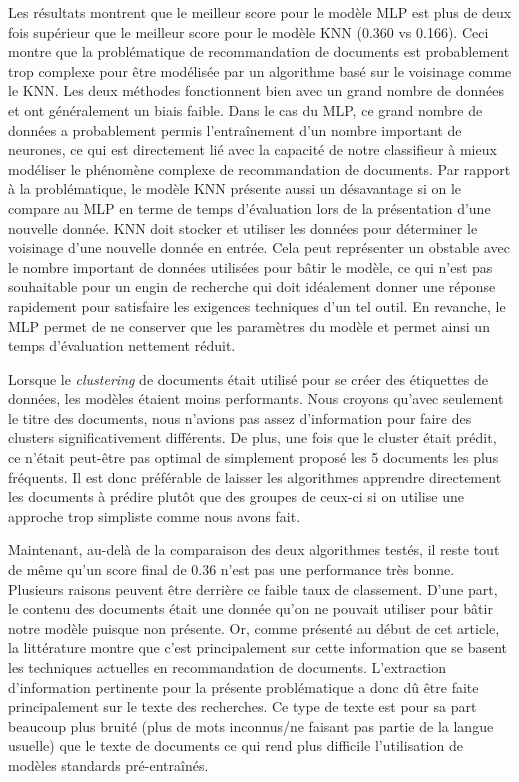 Les résultats montrent que le meilleur score pour le modèle MLP est plus de deux fois supérieur que le meilleur score pour le modèle KNN (0.360 vs 0.166). 
Ceci montre que la problématique de recommandation de documents est probablement trop complexe pour être modélisée par un algorithme basé sur le voisinage comme le KNN. 
Les deux méthodes fonctionnent bien avec un grand nombre de données et ont généralement un biais faible. 
Dans le cas du MLP, ce grand nombre de données a probablement permis l'entraînement d'un nombre important de neurones, ce qui est directement lié avec la capacité de notre classifieur à mieux modéliser le phénomène complexe de recommandation de documents. 
Par rapport à la problématique, le modèle KNN présente aussi un désavantage si on le compare au MLP en terme de temps d'évaluation lors de la présentation d'une nouvelle donnée. KNN doit stocker et utiliser les données pour déterminer le voisinage d'une nouvelle donnée en entrée. 
Cela peut représenter un obstable avec le nombre important de données utilisées pour bâtir le modèle, ce qui n'est pas souhaitable pour un engin de recherche qui doit idéalement donner une réponse rapidement pour satisfaire les exigences techniques d'un tel outil. 
En revanche, le MLP permet de ne conserver que les paramètres du modèle et permet ainsi un temps d'évaluation nettement réduit.
\break

Lorsque le \textit{clustering} de documents était utilisé pour se créer des étiquettes de données, les modèles étaient moins performants. 
Nous croyons qu'avec seulement le titre des documents, nous n'avions pas assez d'information pour faire des clusters significativement différents. 
De plus, une fois que le cluster était prédit, ce n'était peut-être pas optimal de simplement proposé les 5 documents les plus fréquents. 
Il est donc préférable de laisser les algorithmes apprendre directement les documents à prédire plutôt que des groupes de ceux-ci si on utilise une approche trop simpliste comme nous avons fait.
\break

Maintenant, au-delà de la comparaison des deux algorithmes testés, il reste tout de même qu'un score final de 0.36 n'est pas une performance très bonne.
Plusieurs raisons peuvent être derrière ce faible taux de classement. 
D'une part, le contenu des documents était une donnée qu'on ne pouvait utiliser pour bâtir notre modèle puisque non présente.
Or, comme présenté au début de cet article, la littérature montre que c'est principalement sur cette information que se basent les techniques actuelles en recommandation de documents. 
L'extraction d'information pertinente pour la présente problématique a donc dû être faite principalement sur le texte des recherches. 
Ce type de texte est pour sa part beaucoup plus bruité (plus de mots inconnus/ne faisant pas partie de la langue usuelle) que le texte de documents ce qui rend plus difficile l'utilisation de modèles standards pré-entraînés.

